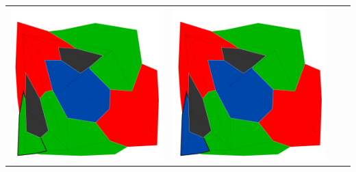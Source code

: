\documentclass[10pt,a4paper]{article}
\begin{document}
\begin{tabular}{c c c c }
	\includegraphics[scale=.10]{../results/backtracking_simple/map_build/bt_simple_I00011.pdf}&
	\includegraphics[scale=.10]{../results/backtracking_simple/map_build/bt_simple_I00012.pdf}\\
	

\end{tabular}
\end{document}
